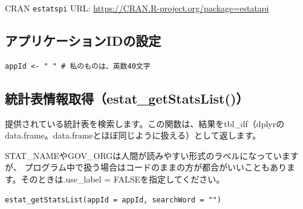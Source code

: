 \documentclass[
  xelatex, ja=standard]{bxjsbook}
\theoremstyle{definition}
\theoremstyle{definition}
\theoremstyle{definition}
\theoremstyle{definition}
\theoremstyle{remark}
\begin{document}
CRAN \texttt{estatspi} URL: \url{https://CRAN.R-project.org/package=estatapi}

\hypertarget{ux30a2ux30d7ux30eaux30b1ux30fcux30b7ux30e7ux30f3idux306eux8a2dux5b9a-1}{%
\subsection{アプリケーションIDの設定}\label{ux30a2ux30d7ux30eaux30b1ux30fcux30b7ux30e7ux30f3idux306eux8a2dux5b9a-1}}

\begin{verbatim}
appId <- " " # 私のものは、英数40文字
\end{verbatim}

\hypertarget{ux7d71ux8a08ux8868ux60c5ux5831ux53d6ux5f97estat_getstatslist}{%
\subsection{統計表情報取得（estat\_getStatsList()）}\label{ux7d71ux8a08ux8868ux60c5ux5831ux53d6ux5f97estat_getstatslist}}

提供されている統計表を検索します。この関数は、結果をtbl\_df（dplyrのdata.frame。data.frameとほぼ同じように扱える）として返します。

STAT\_NAMEやGOV\_ORGは人間が読みやすい形式のラベルになっていますが、 プログラム中で扱う場合はコードのままの方が都合がいいこともあります。そのときは.use\_label = FALSEを指定してください。

\begin{verbatim}
estat_getStatsList(appId = appId, searchWord = "")
\end{verbatim}
\end{document}
